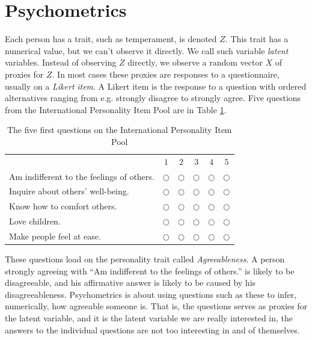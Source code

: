 
\section{Psychometrics}

Each person has a trait, such as temperament, is denoted $Z$. This trait has a numerical value, but we can't observe it directly. We call such variable \emph{latent }variables. Instead of observing $Z$ directly, we observe a random vector $X$ of proxies for $Z$. In most cases these proxies are responses to a questionnaire, usually on a \emph{Likert} \emph{item}. A Likert item is the response to a question with ordered alternatives ranging from e.g. strongly disagree to strongly agree. Five questions from the International Personality Item Pool \parencite{Goldberg1992-hp} are in Table \ref{tab:IPIP}.

\begin{table}
\caption{\label{tab:IPIP}The five first questions on the International Personality Item Pool \parencite{Goldberg1992-hp}}
\noindent \begin{centering}
\begin{tabular}{lccccc}
 & $1$ & $2$ & $3$ & $4$ & $5$\tabularnewline
Am indifferent to the feelings of others.  & $\bigcirc$ & $\bigcirc$ & $\bigcirc$ & $\bigcirc$ & $\bigcirc$\tabularnewline
Inquire about others' well-being. & $\bigcirc$ & $\bigcirc$ & $\bigcirc$ & $\bigcirc$ & $\bigcirc$\tabularnewline
Know how to comfort others. & $\bigcirc$ & $\bigcirc$ & $\bigcirc$ & $\bigcirc$ & $\bigcirc$\tabularnewline
Love children. & $\bigcirc$ & $\bigcirc$ & $\bigcirc$ & $\bigcirc$ & $\bigcirc$\tabularnewline
Make people feel at ease.  & $\bigcirc$ & $\bigcirc$ & $\bigcirc$ & $\bigcirc$ & $\bigcirc$\tabularnewline
\end{tabular}
\par\end{centering}
\vskip7.0pt
\noindent {}
\end{table}

These questions load on the personality trait called \emph{Agreeableness}. A person strongly agreeing with ``Am indifferent to the feelings of others.'' is likely to be disagreeable, and his affirmative answer is likely to be caused by his disagreeableness. Psychometrics is about using questions such as these to infer, numerically, how agreeable someone is. That is, the questions serves as proxies for the latent variable, and it is the latent variable we are really interested in, the answers to the individual questions are not too interesting in and of themselves.

